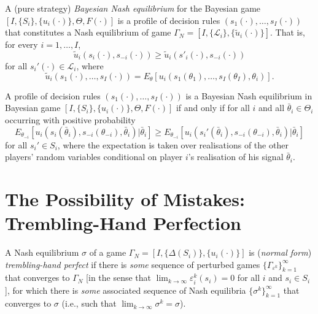 \begin{defn}
    A (pure strategy) \emph{Bayesian Nash equilibrium} for the Bayesian game $[I, \{S_i\}, \{u_i(\cdot)\}, \Theta, F(\cdot)]$ is a profile of decision rules $(s_1(\cdot), \dots, s_I(\cdot))$ that constitutes a Nash equilibrium of game $\Gamma_N = [I, \{\mathscr{L}_i\}, \{\tilde{u}_i(\cdot)\}]$. That is, for every $i = 1, \dots, I$,
    \begin{equation*}
        \tilde{u}_i \left(s_i(\cdot), s_{-i}(\cdot)\right) \geq \tilde{u}_i \left(s'_i(\cdot), s_{-i}(\cdot)\right)
    \end{equation*}
    for all $s_i'(\cdot) \in \mathscr{L}_i$, where 
    \begin{equation*}
        \tilde{u}_i \left(s_1(\cdot), \dots, s_I(\cdot) \right) = E_\theta \left[ u_i \left(s_1(\theta_1), \dots, s_I(\theta_I), \theta_i \right) \right].
    \end{equation*}
\end{defn}

\begin{prop}
    A profile of decision rules $(s_1(\cdot), \dots, s_I(\cdot))$ is a Bayesian Nash equilibrium in Bayesian game $[I, \{S_i\}, \{u_i(\cdot)\}, \Theta, F(\cdot)]$ if and only if for all $i$ and all $\bar{\theta}_i \in \Theta_i$ occurring with positive probability
    \begin{equation*}
        E_{\theta_{-i}} \left[ u_i \left( s_i (\bar{\theta}_i), s_{-i}(\theta_{-i}), \bar{\theta}_i \right) | \bar{\theta}_i \right] \geq E_{\theta_{-i}} \left[ u_i \left( s_i' (\bar{\theta}_i), s_{-i}(\theta_{-i}), \bar{\theta}_i \right) | \bar{\theta}_i \right]
    \end{equation*}
    for all $s_i' \in S_i$, where the expectation is taken over realisations of the other players' random variables conditional on player $i$'s realisation of his signal $\bar{\theta}_i$.
\end{prop}


\section{The Possibility of Mistakes: Trembling-Hand Perfection}

\begin{defn}
    A Nash equilibrium $\sigma$ of a game $\Gamma_N = [I, \{\Delta(S_i)\}, \{u_i(\cdot)\}]$ is (\emph{normal form}) \emph{trembling-hand perfect} if there is \emph{some} sequence of perturbed games $\{\Gamma_{\varepsilon^k}\}_{k = 1}^\infty$ that converges to $\Gamma_N$ [in the sense that $\lim_{k \to \infty} \varepsilon_i^k (s_i) = 0$ for all $i$ and $s_i \in S_i$], for which there is \emph{some} associated sequence of Nash equilibria $\{\sigma^k\}_{k = 1}^\infty$ that converges to $\sigma$ (i.e., such that $\lim_{k \to \infty} \sigma^k = \sigma$).
\end{defn}

